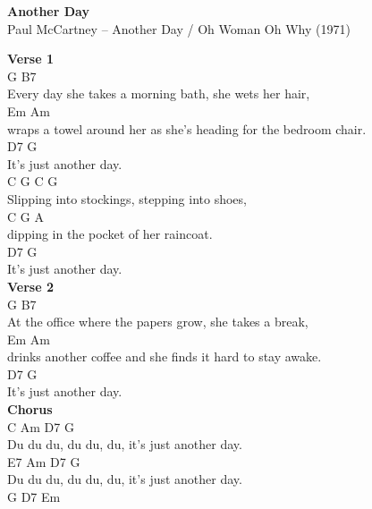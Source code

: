 \documentclass[a4paper]{article}
\begin{document}
    \begin{center}
        \textbf{Another Day}
        ~\\
        Paul McCartney -- Another Day / Oh Woman Oh Why (1971)
    \end{center}
    {
        \scriptsize
        \textbf{Verse 1}
        ~\\
        {
            \cutive
            \obeyspaces
      G                                 B7
\\
Every day she takes a morning bath, she wets her hair,
\\
Em                                Am
\\
wraps a towel around her as she's heading for the bedroom chair.
\\
          D7       G
\\
It's just another day.
\\
C             G          C             G
\\
Slipping into stockings, stepping into shoes,
\\
C              G              A
\\
dipping in the pocket of her raincoat.
\\
D7                   G
\\
  It's just another day.
\\

        }
        \textbf{Verse 2}
        ~\\
        {
            \cutive
            \obeyspaces
       G                                 B7
\\
At the office where the papers grow, she takes a break,
\\
Em                            Am
\\
drinks another coffee and she finds it hard to stay awake.
\\
          D7       G
\\
It's just another day.
\\

        }
        \textbf{Chorus}
        ~\\
        {
            \cutive
            \obeyspaces
C                   Am          D7       G
\\
 Du du du, du du, du, it's just another day.
\\
          E7       Am          D7       G
\\
Du du du, du du, du, it's just another day.
\\
G  D7  Em
\\

}}
\end{document}
